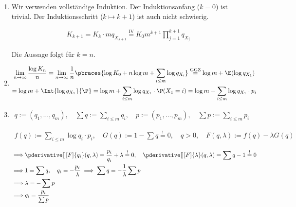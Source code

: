 \begin{solution}

\phantom{}

\begin{enumerate}[label = (\alph*)]

    \item Wir verwenden vollständige Induktion.
    Der Induktionsanfang ($k = 0$) ist trivial.
    Der Induktionsschritt ($k \mapsto k + 1$) ist auch nicht schwierig.

    \begin{align*}
        K_{k+1}
        =
        K_k \cdot m q_{X_{k+1}}
        \stackrel
        {
            \text{IV}
        }{=}
        K_0 m^{k+1} \prod_{j=1}^{k+1} q_{X_j}
    \end{align*}

    Die Aussage folgt für $k = n$.

    \item

    \begin{multline*}
        \lim_{n \to \infty}
            \frac{\log K_n}{n}
        =
        \lim_{n \to \infty}
            \frac{1}{n}
            \pbraces
            {
                \log K_0 + n \log m + \sum_{i \leq m} \log q_{X_i}
            }
        \stackrel
        {
            \text{GGZ}
        }{=}
        \log m + \E(\log q_{X_1}) \\
        =
        \log m + \Int{\log q_{X_1}}{\P}
        =
        \log m + \sum_{i \leq m} \log q_{X_1} \cdot \P(X_1 = i)
        =
        \log m + \sum_{i \leq m} \log q_{X_1} \cdot p_i
    \end{multline*}

    \item

    \begin{align*}
        q := (q_1, \dots, q_m),
        \quad
        \sum q := \sum_{i \leq m} q_i,
        \quad
        p := (p_1, \dots, p_m),
        \quad
        \sum p := \sum_{i \leq m} p_i
    \end{align*}

    \begin{gather*}
        f(q) := \sum_{i \leq m} \log q_i \cdot p_i,
        \quad
        G(q) := 1 - \sum q \stackrel{!}{=} 0,
        \quad
        q > 0,
        \quad
        F(q, \lambda) := f(q) - \lambda G(q)
    \end{gather*}

    \begin{align*}
        \implies
            &   \pderivative[][F]{q_i}    (q, \lambda) = \frac{p_i}{q_i} + \lambda \stackrel{!}{=} 0,
                \quad
                \pderivative[][F]{\lambda}(q, \lambda) = \sum q - 1   \stackrel{!}{=} 0  \\
        \implies
            &   1 = \sum q,
                \quad
                q_i = -\frac{p_i}{\lambda} \implies \sum q = -\frac{1}{\lambda} \sum p \\
        \implies
            & \lambda = -\sum p \\
        \implies
            & q_i = \frac{p_i}{\sum p}
    \end{align*}


\end{enumerate}
\end{solution}
